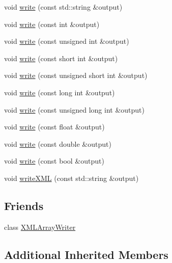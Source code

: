 \begin{DoxyCompactItemize}
\item 
void \mbox{\hyperlink{classADATXML_1_1XMLWriter_a82f1a99241ecd26ea2bd7f3d87364ed7}{write}} (const std\+::string \&output)
\item 
void \mbox{\hyperlink{classADATXML_1_1XMLWriter_aa027c8bf616bdc96982bb11a2610469e}{write}} (const int \&output)
\item 
void \mbox{\hyperlink{classADATXML_1_1XMLWriter_a36ebb7ce3a0fde310c457c9520ca961e}{write}} (const unsigned int \&output)
\item 
void \mbox{\hyperlink{classADATXML_1_1XMLWriter_ab29dc20acb63a2ac633b35cc03e6e58f}{write}} (const short int \&output)
\item 
void \mbox{\hyperlink{classADATXML_1_1XMLWriter_a07c953442846b4d1f2d34b00a9371626}{write}} (const unsigned short int \&output)
\item 
void \mbox{\hyperlink{classADATXML_1_1XMLWriter_a39b29ce03b5b71ef853e1952d1899d73}{write}} (const long int \&output)
\item 
void \mbox{\hyperlink{classADATXML_1_1XMLWriter_a5536c007036f96cc720f38199c3ee6a3}{write}} (const unsigned long int \&output)
\item 
void \mbox{\hyperlink{classADATXML_1_1XMLWriter_adafcb9ed0bb0a4de7a590d877ada4d6f}{write}} (const float \&output)
\item 
void \mbox{\hyperlink{classADATXML_1_1XMLWriter_a54aeec25255feb2aa7063885ca48aa7e}{write}} (const double \&output)
\item 
void \mbox{\hyperlink{classADATXML_1_1XMLWriter_af2cc624cb1450f5b6f430573b626e73e}{write}} (const bool \&output)
\item 
void \mbox{\hyperlink{classADATXML_1_1XMLWriter_a887415a6f26bde42e76af7d831087c7e}{write\+X\+ML}} (const std\+::string \&output)
\end{DoxyCompactItemize}
\subsection*{Friends}
\begin{DoxyCompactItemize}
\item 
class \mbox{\hyperlink{classADATXML_1_1XMLWriter_a5aadf941042ceaf969503029ae4f005b}{X\+M\+L\+Array\+Writer}}
\end{DoxyCompactItemize}
\subsection*{Additional Inherited Members}


